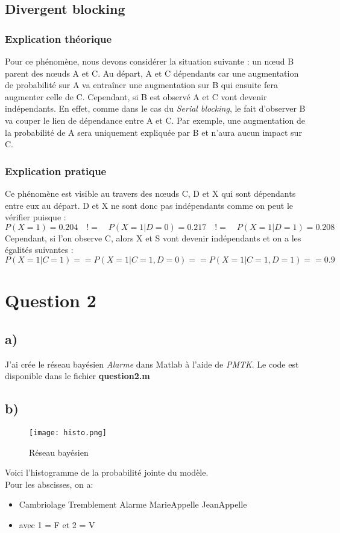 \documentclass[12pt]{article}
\begin{document}
\subsection{Divergent blocking}
\subsubsection{Explication théorique}
Pour ce phénomène, nous devons considérer la situation suivante : un nœud B parent des nœuds A et C.
Au départ, A et C dépendants car une augmentation de probabilité sur A va entraîner une augmentation sur B qui ensuite fera augmenter celle de C. Cependant, si B est observé A et C vont devenir indépendants. En effet, comme dans le cas du \textit{Serial blocking}, le fait d'observer B va couper le lien de dépendance entre A et C. Par exemple, une augmentation de la probabilité de A sera uniquement expliquée par B et n'aura aucun impact sur C.
\subsubsection{Explication pratique}
Ce phénomène est visible au travers des nœuds C, D et X qui sont dépendants entre eux au départ. D et X ne sont donc pas indépendants comme on peut le vérifier puisque : $P(X=1)=0.204\quad != \quad P(X=1|D=0)=0.217\quad !=\quad P(X=1|D=1)=0.208$ \\
Cependant, si l'on observe C, alors X et S vont devenir indépendants et on a les égalités suivantes : \\
$P(X=1|C=1) == P(X=1|C=1,D=0) == P(X=1|C=1,D=1) == 0.9$

\section{Question 2}
\subsection{a)} J'ai crée le réseau bayésien \textit{Alarme} dans Matlab à l'aide de \textit{PMTK}. Le code est disponible dans le fichier \textbf{question2.m}
\subsection{b)}
\begin{figure}[H]
	\texttt{[image: histo.png]}
	\caption{Réseau bayésien}
	\label{fig:reseau_bayesien}
\end{figure}
Voici l'histogramme de la probabilité jointe du modèle.
\\Pour les abscisses, on a: 
\begin{itemize}
\item Cambriolage Tremblement Alarme MarieAppelle JeanAppelle
\item avec 1 = F et 2 = V
\end{itemize}
\end{document}
